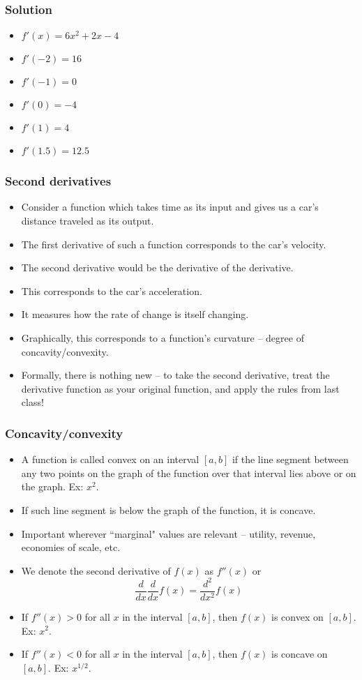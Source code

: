 \documentclass[xcolor=dvipsnames]{beamer} %
\begin{document}
\begin{frame}
\frametitle{Solution}
\begin{itemize}
\item $f'(x) = 6x^2 + 2x - 4$
\item $f'(-2) = 16$
\item $f'(-1) =  0$
\item $f'(0) =  -4$
\item $f'(1) =  4$
\item $f'(1.5) = 12.5$
\end{itemize}
\end{frame}

\begin{frame}
\frametitle{Second derivatives}
\begin{itemize}
\item Consider a function which takes time as its input and gives us a car's distance traveled as its output. 
\item The first derivative of such a function corresponds to the car's velocity. 
\item The second derivative would be the derivative of the derivative. 
\item This corresponds to the car's acceleration. 
\item It measures how the rate of change is itself changing. 
\item Graphically, this corresponds to a function's curvature -- degree of concavity/convexity.  
\item Formally, there is nothing new -- to take the second derivative, treat the derivative function as your original function, and apply the rules from last class!
\end{itemize}
\end{frame}

\begin{frame}
\frametitle{Concavity/convexity}
\begin{small}
\begin{itemize}
\item A function is called convex on an interval $[a, b]$ if the line segment between any two points on the graph of the function over that interval lies above or on the graph. Ex: $x^2$.
\item If such line segment is below the graph of the function, it is concave. 
\item Important wherever ``marginal" values are relevant -- utility, revenue, economies of scale, etc. 
\item We denote the second derivative of $f(x)$ as $f''(x)$ or $$\frac{d}{dx} \frac{d}{dx} f(x) = \frac{d^2}{dx^2} f(x)$$
\item \textcolor{dark_red}{If $f''(x) > 0$ for all $x$ in the interval $[a, b]$, then $f(x)$ is convex on $[a, b]$. Ex: $x^2$.}
\item \textcolor{dark_red}{If $f''(x) < 0$ for all $x$ in the interval $[a, b]$, then $f(x)$ is concave on $[a, b]$. Ex: $x^{1/2}$.}
\end{itemize}
\end{small}
\end{frame}
\end{document}
